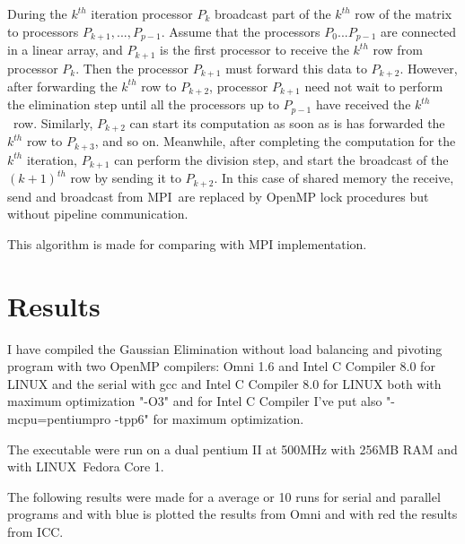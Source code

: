 \documentclass[a4paper]{article}
\begin{document}
During the $k^{th}$ iteration processor $P_{k}$ broadcast part of the $%
k^{th} $ row of the matrix to processors $P_{k+1},...,P_{p-1}$. Assume that
the processors $P_{0}...P_{p-1}$ are connected in a linear array, and $%
P_{k+1}$ is the first processor to receive the $k^{th}$ row from processor $%
P_{k}$. Then the processor $P_{k+1}$ must forward this data to $P_{k+2}$.
However, after forwarding the $k^{th}$ row to $P_{k+2}$, processor $P_{k+1}$
need not wait to perform the elimination step until all the processors up to 
$P_{p-1}$ have received the $k^{th}\,$\ row. Similarly, $P_{k+2}$ can start
its computation as soon as is has forwarded the $k^{th}$ row to $P_{k+3}$,
and so on. Meanwhile, after completing the computation for the $k^{th}$
iteration, $P_{k+1}$ can perform the division step, and start the broadcast
of the $(k+1)^{th}$ row by sending it to $P_{k+2}$. In this case of shared
memory the receive, send and broadcast from MPI\ are replaced by OpenMP lock
procedures but without pipeline communication.

This algorithm is made for comparing with MPI implementation.

\section{Results}

I have compiled the Gaussian Elimination without load balancing and pivoting
program with two OpenMP compilers: Omni 1.6 and Intel C Compiler 8.0 for
LINUX and the serial with gcc and Intel C Compiler 8.0 for LINUX both with
maximum optimization "-O3" and for Intel C Compiler I've put also
"-mcpu=pentiumpro -tpp6" for maximum optimization.

The executable were run on a dual pentium II at 500MHz with 256MB RAM and
with LINUX\ Fedora Core 1.

The following results were made for a average or 10 runs for serial and
parallel programs and with blue is plotted the results from Omni and with
red the results from ICC.

\begin{center}
\end{center}
\end{document}
